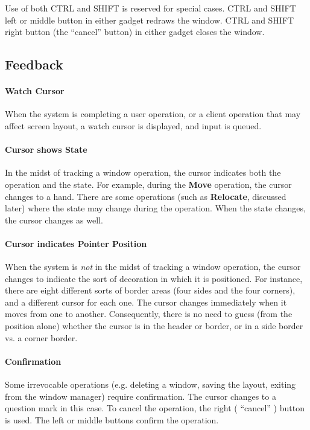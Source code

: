 Use of both CTRL and SHIFT is reserved for special cases.
CTRL and SHIFT left or middle button in either gadget redraws the window.
CTRL and SHIFT right button (the ``cancel'' button) in either gadget
closes the window.

\subsection{Feedback}

\paragraph{Watch Cursor}

When the system is completing a user operation, or a client operation
that may affect screen layout, a watch cursor is
displayed, and input is queued.

\paragraph{Cursor shows State}

In the midst of tracking a window operation, the cursor indicates both
the operation and the state.
For example, during the {\bf Move} operation, the cursor changes to a hand.
There are some operations (such as {\bf Relocate}, discussed later)
where the state may change during the operation.
When the state changes, the cursor changes as well.

\paragraph{Cursor indicates Pointer Position}

When the system is {\it not} in the midst of tracking a window operation,
the cursor changes to indicate the sort of decoration in which it is
positioned.
For instance, there are eight different sorts of border areas
(four sides and the four corners), and a different cursor for each one.
The cursor changes immediately when it moves from one to another.
Consequently, there is no need to guess (from the position alone) whether
the cursor is in the header or border, or in a side border vs. a corner
border.

\paragraph{Confirmation}

Some irrevocable operations (e.g. deleting a window, saving the layout,
exiting from the window manager) require confirmation.  The cursor
changes to a question mark in this case.  To cancel the operation, the
right ( ``cancel'' ) button is used.  The left or middle buttons confirm
the operation.

